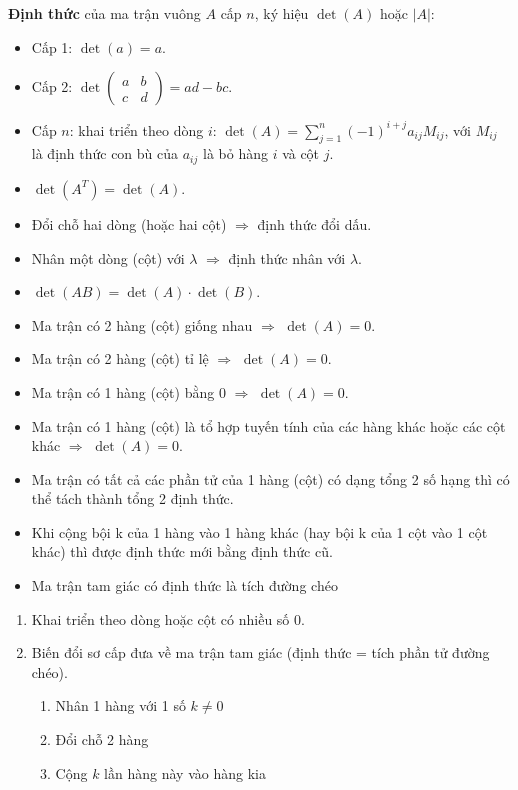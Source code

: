 \documentclass[12pt,a4paper]{article}
\begin{document}
\begin{dinhnghia}
  \textbf{Định thức} của ma trận vuông $A$ cấp $n$, ký hiệu $\det(A)$ hoặc $|A|$:
  \begin{itemize}
    \item Cấp 1: $\det(a) = a$.
    \item Cấp 2: $\det\begin{pmatrix} a & b \\ c & d \end{pmatrix} = ad - bc$.
    \item Cấp $n$: khai triển theo dòng $i$: $\det(A) = \sum_{j=1}^{n} (-1)^{i+j} a_{ij} M_{ij}$, với $M_{ij}$ là định thức con bù của $a_{ij}$ là bỏ hàng $i$ và cột $j$.
  \end{itemize}
\end{dinhnghia}

\begin{dinhly}[title={Tính chất định thức}]
  \begin{itemize}
    \item $\det(A^T) = \det(A)$.
    \item Đổi chỗ hai dòng (hoặc hai cột) $\Rightarrow$ định thức đổi dấu.
    \item Nhân một dòng (cột) với $\lambda$ $\Rightarrow$ định thức nhân với $\lambda$.
    \item $\det(AB) = \det(A) \cdot \det(B)$.
    \item Ma trận có 2 hàng (cột) giống nhau $\Rightarrow$ $\det(A) = 0$.
    \item Ma trận có 2 hàng (cột) tỉ lệ $\Rightarrow$ $\det(A) = 0$.
    \item Ma trận có 1 hàng (cột) bằng 0 $\Rightarrow$ $\det(A) = 0$.
    \item Ma trận có 1 hàng (cột) là tổ hợp tuyến tính của các hàng khác hoặc các cột khác $\Rightarrow$ $\det(A) = 0$.
    \item Ma trận có tất cả các phần tử của 1 hàng (cột) có dạng tổng 2 số hạng thì có thể tách thành tổng 2 định thức.
    \item Khi cộng bội k của 1 hàng vào 1 hàng khác (hay bội k của 1 cột vào 1 cột khác) thì được định thức mới bằng định thức cũ.
    \item Ma trận tam giác có định thức là tích đường chéo
  \end{itemize}
\end{dinhly}

\begin{phuongphap}[title={Tính định thức}]
  \begin{enumerate}
    \item Khai triển theo dòng hoặc cột có nhiều số 0.
    \item Biến đổi sơ cấp đưa về ma trận tam giác (định thức = tích phần tử đường chéo).
    \begin{enumerate}
      \item Nhân 1 hàng với 1 số $k \ne 0$
      \item Đổi chỗ 2 hàng
      \item Cộng $k$ lần hàng này vào hàng kia
    \end{enumerate}
  \end{enumerate}
\end{phuongphap}
\end{document}
